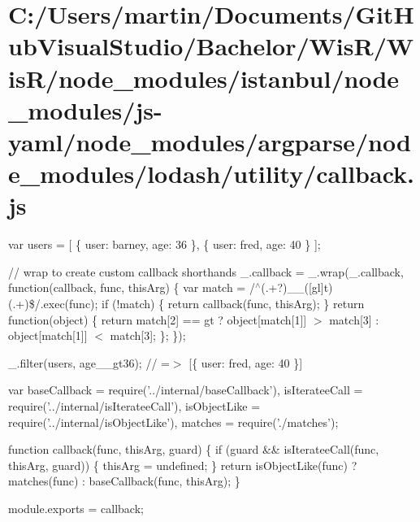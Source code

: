 \hypertarget{_c_1_2_users_2martin_2_documents_2_git_hub_visual_studio_2_bachelor_2_wis_r_2_wis_r_2node_moduleee81e05814e833cfac1ba7275d5e1502}{}\section{C\+:/\+Users/martin/\+Documents/\+Git\+Hub\+Visual\+Studio/\+Bachelor/\+Wis\+R/\+Wis\+R/node\+\_\+modules/istanbul/node\+\_\+modules/js-\/yaml/node\+\_\+modules/argparse/node\+\_\+modules/lodash/utility/callback.\+js}
var users = \mbox{[} \{ \textquotesingle{}user\textquotesingle{}\+: \textquotesingle{}barney\textquotesingle{}, \textquotesingle{}age\textquotesingle{}\+: 36 \}, \{ \textquotesingle{}user\textquotesingle{}\+: \textquotesingle{}fred\textquotesingle{}, \textquotesingle{}age\textquotesingle{}\+: 40 \} \mbox{]};

// wrap to create custom callback shorthands \+\_\+.\+callback = \+\_\+.\+wrap(\+\_\+.\+callback, function(callback, func, this\+Arg) \{ var match = /$^\wedge$(.+?)\+\_\+\+\_\+(\mbox{[}gl\mbox{]}t)(.+)\$/.exec(func); if (!match) \{ return callback(func, this\+Arg); \} return function(object) \{ return match\mbox{[}2\mbox{]} == \textquotesingle{}gt\textquotesingle{} ? object\mbox{[}match\mbox{[}1\mbox{]}\mbox{]} $>$ match\mbox{[}3\mbox{]} \+: object\mbox{[}match\mbox{[}1\mbox{]}\mbox{]} $<$ match\mbox{[}3\mbox{]}; \}; \});

\+\_\+.\+filter(users, \textquotesingle{}age\+\_\+\+\_\+gt36\textquotesingle{}); // =$>$ \mbox{[}\{ \textquotesingle{}user\textquotesingle{}\+: \textquotesingle{}fred\textquotesingle{}, \textquotesingle{}age\textquotesingle{}\+: 40 \}\mbox{]}


\begin{DoxyCodeInclude}
var baseCallback = require(\textcolor{stringliteral}{'../internal/baseCallback'}),
    isIterateeCall = require(\textcolor{stringliteral}{'../internal/isIterateeCall'}),
    isObjectLike = require(\textcolor{stringliteral}{'../internal/isObjectLike'}),
    matches = require(\textcolor{stringliteral}{'./matches'});

\textcolor{keyword}{function} callback(func, thisArg, guard) \{
  \textcolor{keywordflow}{if} (guard && isIterateeCall(func, thisArg, guard)) \{
    thisArg = undefined;
  \}
  \textcolor{keywordflow}{return} isObjectLike(func)
    ? matches(func)
    : baseCallback(func, thisArg);
\}

module.exports = callback;
\end{DoxyCodeInclude}
 